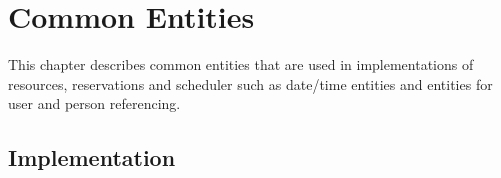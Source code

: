 \chapter{Common Entities}

This chapter describes common entities that are used in implementations of resources, reservations and scheduler such as date/time entities and entities for user and person referencing.

\section{Implementation}

